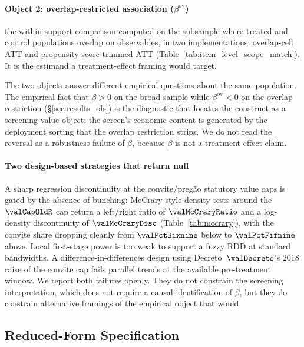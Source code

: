 \paragraph{Object 2: overlap-restricted association ($\beta^{\text{ov}}$)}
the within-support comparison computed on the subsample where
treated and control populations overlap on observables, in two
implementations: overlap-cell ATT and propensity-score-trimmed
ATT (Table~\ref{tab:item_level_scope_match}). It is the
estimand a treatment-effect framing would target.

The two objects answer different empirical questions about the
same population. The empirical fact that $\beta>0$ on the broad
sample while $\beta^{\text{ov}}<0$ on the overlap restriction
(§\ref{sec:results_ols}) is the diagnostic that locates the
construct as a screening-value object: the screen's economic
content is generated by the deployment sorting that the overlap
restriction strips. We do not read the reversal as a robustness
failure of $\beta$, because $\beta$ is not a treatment-effect
claim.

\paragraph{Two design-based strategies that return null}
A sharp regression discontinuity at the convite/preg\~ao
statutory value caps is gated by the absence of bunching:
McCrary-style density tests around the $\valCapOldR$ cap return
a left/right ratio of $\valMcCraryRatio$ and a log-density
discontinuity of $\valMcCraryDisc$
(Table~\ref{tab:mccrary}), with the convite share dropping
cleanly from $\valPctSixnine$ below to $\valPctFifnine$ above.
Local first-stage power is too weak to support a fuzzy RDD at
standard bandwidths. A difference-in-differences design using
Decreto~$\valDecreto$'s $2018$ raise of the convite cap fails
parallel trends at the available pre-treatment window. We
report both failures openly. They do not constrain the
screening interpretation, which does not require a causal
identification of $\beta$, but they do constrain alternative
framings of the empirical object that would.

\subsection{Reduced-Form Specification}
\label{sec:emp_reduced}

